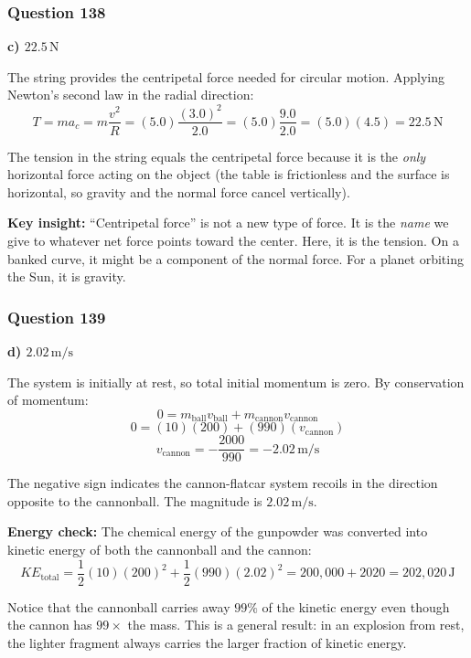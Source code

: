 \documentclass[12pt,letterpaper]{article}
\begin{document}
\subsubsection*{Question 138}

\begin{answerbox}
\textbf{c) $22.5\,\text{N}$}
\end{answerbox}

\begin{explanationbox}
The string provides the centripetal force needed for circular motion. Applying Newton's second law in the radial direction:
\[
T = ma_c = m\frac{v^2}{R} = (5.0)\frac{(3.0)^2}{2.0} = (5.0)\frac{9.0}{2.0} = (5.0)(4.5) = 22.5\,\text{N}
\]

The tension in the string equals the centripetal force because it is the \emph{only} horizontal force acting on the object (the table is frictionless and the surface is horizontal, so gravity and the normal force cancel vertically).

\textbf{Key insight:} ``Centripetal force'' is not a new type of force. It is the \emph{name} we give to whatever net force points toward the center. Here, it is the tension. On a banked curve, it might be a component of the normal force. For a planet orbiting the Sun, it is gravity.
\end{explanationbox}

\subsubsection*{Question 139}

\begin{answerbox}
\textbf{d) $2.02\,\text{m/s}$}
\end{answerbox}

\begin{explanationbox}
The system is initially at rest, so total initial momentum is zero. By conservation of momentum:
\[
0 = m_{\text{ball}}v_{\text{ball}} + m_{\text{cannon}}v_{\text{cannon}}
\]
\[
0 = (10)(200) + (990)(v_{\text{cannon}})
\]
\[
v_{\text{cannon}} = -\frac{2000}{990} = -2.02\,\text{m/s}
\]

The negative sign indicates the cannon-flatcar system recoils in the direction opposite to the cannonball. The magnitude is $2.02\,\text{m/s}$.

\textbf{Energy check:} The chemical energy of the gunpowder was converted into kinetic energy of both the cannonball and the cannon:
\[
KE_{\text{total}} = \frac{1}{2}(10)(200)^2 + \frac{1}{2}(990)(2.02)^2 = 200{,}000 + 2020 = 202{,}020\,\text{J}
\]

Notice that the cannonball carries away $99\%$ of the kinetic energy even though the cannon has $99\times$ the mass. This is a general result: in an explosion from rest, the lighter fragment always carries the larger fraction of kinetic energy.
\end{explanationbox}
\end{document}

